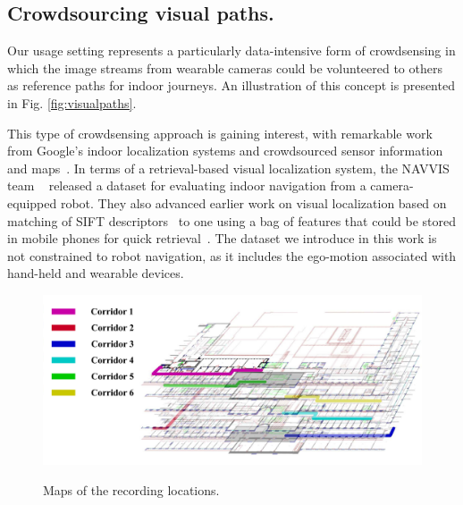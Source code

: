 \subsection{Crowdsourcing visual paths.}
Our usage setting represents a particularly data-intensive form of crowdsensing in which the image streams  from wearable cameras could be volunteered to others as reference paths for indoor journeys. An illustration of this concept is presented in Fig. \ref{fig:visualpaths}. 

This type of crowdsensing approach is gaining interest, with remarkable work from Google's indoor localization systems and crowdsourced sensor information and maps~\cite{Kadous2013}. In terms of a retrieval-based visual localization system, the NAVVIS team ~\cite{Huitl2012} released a dataset for evaluating indoor navigation from a camera-equipped robot. They also advanced earlier work on visual localization based on matching of SIFT descriptors~\cite{Park2008} to one using a bag of features that could be stored in mobile phones for quick retrieval~\cite{Schroth2011,Schroth2012}. The dataset we introduce in this work is not constrained to robot navigation, as it includes the ego-motion associated with hand-held and wearable devices.

\begin{figure}[t]
\includegraphics[width=\linewidth]{./gfx/Chapter04/map_and_legend.pdf}\label{fig:visualpathsA}
\caption{Maps of the recording locations.}
\label{fig:map_and_legend}
\end{figure}


